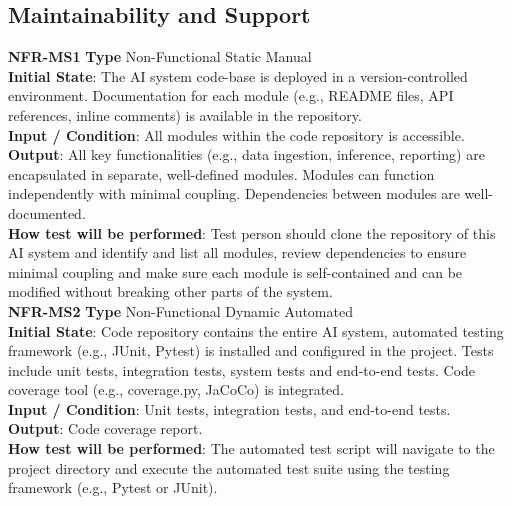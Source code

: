 \documentclass[12pt, titlepage]{article}
\begin{document}
\subsection{Maintainability and Support}
\textbf{NFR-MS1} \textbf{Type} Non-Functional Static Manual\\
        \indent \textbf{Initial State}: The AI system code-base is deployed in a version-controlled environment. Documentation for each module (e.g., README files, API references, inline comments) is available in the repository.\\
        \indent \textbf{Input / Condition}: All modules within the code repository is accessible.\\
        \indent \textbf{Output}: All key functionalities (e.g., data ingestion, inference, reporting) are encapsulated in separate, well-defined modules. Modules can function independently with minimal coupling. Dependencies between modules are well-documented.\\
        \indent \textbf{How test will be performed}: Test person should clone the repository of this AI system and identify and list all modules, review dependencies to ensure minimal coupling and make sure each module is self-contained and can be modified without breaking other parts of the system.\\

\noindent \textbf{NFR-MS2} \textbf{Type} Non-Functional Dynamic Automated\\
        \indent \textbf{Initial State}: Code repository contains the entire AI system, automated testing framework (e.g., JUnit, Pytest)  is installed and configured in the project. Tests include unit tests, integration tests, system tests and end-to-end tests. Code coverage tool (e.g., coverage.py, JaCoCo) is integrated.\\
        \indent \textbf{Input / Condition}: Unit tests, integration tests, and end-to-end tests.\\
        \indent \textbf{Output}: Code coverage report.\\
        \indent \textbf{How test will be performed}: The automated test script will navigate to the project directory and execute the automated test suite using the testing framework (e.g., Pytest or JUnit).\\
\end{document}
